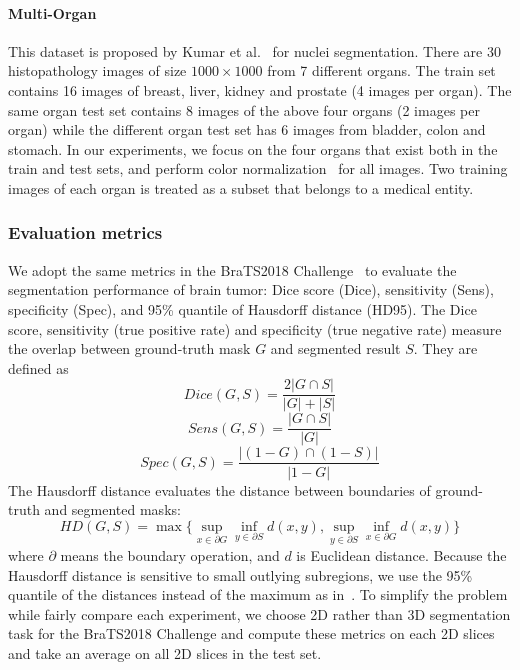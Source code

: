\paragraph{Multi-Organ}
This dataset is proposed by Kumar et al.~\cite{kumar2017dataset} for nuclei segmentation. There are 30 histopathology images of size $1000\times1000$ from 7 different organs. The train set contains 16 images of breast, liver, kidney and prostate (4 images per organ). The same organ test set contains 8 images of the above four organs (2 images per organ) while the different organ test set has 6 images from bladder, colon and stomach. In our experiments, we focus on the four organs that exist both in the train and test sets, and perform color normalization~\cite{reinhard2001color} for all images. Two training images of each organ is treated as a subset that belongs to a medical entity.

\subsubsection{Evaluation metrics}
We adopt the same metrics in the BraTS2018 Challenge~\cite{bakas2018identifying} to evaluate the segmentation performance of brain tumor: Dice score (Dice), sensitivity (Sens), specificity (Spec), and 95\% quantile of Hausdorff distance (HD95). The Dice score, sensitivity (true positive rate) and specificity (true negative rate) measure the overlap between ground-truth mask $G$ and segmented result $S$. They are defined as
\begin{equation}
Dice(G, S) = \frac{2|G \cap S|}{|G| + |S|}
\end{equation}
\begin{equation}
Sens(G, S)=\frac{|G \cap S|}{|G|}
\end{equation}
\begin{equation}
Spec(G, S)=\frac{|(1-G) \cap (1-S)|}{|1-G|}
\end{equation}
The Hausdorff distance evaluates the distance between boundaries of ground-truth and segmented masks:
\begin{equation}
HD(G, S) = \max\{\sup_{x\in\partial G}\inf_{y\in\partial S}d(x, y), \sup_{y\in\partial S}\inf_{x\in\partial G}d(x, y)\}
\end{equation}
where $\partial$ means the boundary operation, and $d$ is Euclidean distance. Because the Hausdorff distance is sensitive to small outlying subregions, we use the 95\% quantile of the distances instead of the maximum as in~\cite{bakas2018identifying}. To simplify the problem while fairly compare each experiment, we choose 2D rather than 3D segmentation task for the BraTS2018 Challenge and compute these metrics on each 2D slices and take an average on all 2D slices in the test set.

